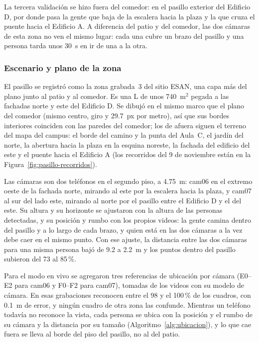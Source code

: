 \documentclass[12pt,a4paper]{article}
\begin{document}
La tercera validación se hizo fuera del comedor: en el pasillo exterior del
Edificio D, por donde pasa la gente que baja de la escalera hacia la plaza y
la que cruza el puente hacia el Edificio A. A diferencia del patio y del
comedor, las dos cámaras de esta zona no ven el mismo lugar: cada una cubre un
brazo del pasillo y una persona tarda unos 30~s en ir de una a la otra.

\subsubsection{Escenario y plano de la zona}

El pasillo se registró como la zona grabada~3 del sitio ESAN, una capa más del
plano junto al patio y al comedor. Es una L de unos 740~m$^2$ pegada a las
fachadas norte y este del Edificio D. Se dibujó en el mismo marco que el plano
del comedor (mismo centro, giro y 29.7~px por metro), así que sus bordes
interiores coinciden con las paredes del comedor; los de afuera siguen el
terreno del mapa del campus: el borde del camino y la punta del Aula~C, el
jardín del norte, la abertura hacia la plaza en la esquina noreste, la
fachada del edificio del este y el puente hacia el Edificio A (los
recorridos del 9 de noviembre están en la Figura~\ref{fig:pasillo-recorridos}).

Las cámaras son dos teléfonos en el segundo piso, a 4.75~m: cam06 en el
extremo oeste de la fachada norte, mirando al este por la escalera hacia la
plaza, y cam07 al sur del lado este, mirando al norte por el pasillo entre el
Edificio D y el del este. Su altura y su horizonte se ajustaron con la altura
de las personas detectadas, y su posición y rumbo con los propios videos: la
gente camina dentro del pasillo y a lo largo de cada brazo, y quien está en
las dos cámaras a la vez debe caer en el mismo punto. Con ese ajuste, la
distancia entre las dos cámaras para una misma persona bajó de 9.2 a 2.2~m y
los puntos dentro del pasillo subieron del 73 al 85\,\%.

Para el modo en vivo se agregaron tres referencias de ubicación por cámara
(E0--E2 para cam06 y F0--F2 para cam07), tomadas de los videos con su modelo
de cámara. En esas grabaciones reconocen entre el 98 y el 100\,\% de los
cuadros, con 0.1~m de error, y ningún cuadro de otra zona las confunde.
Mientras un teléfono todavía no reconoce la vista, cada persona se ubica con
la posición y el rumbo de su cámara y la distancia por su tamaño
(Algoritmo~\ref{alg:ubicacion}), y lo que cae fuera se lleva al borde del
piso del pasillo, no al del patio.
\end{document}
